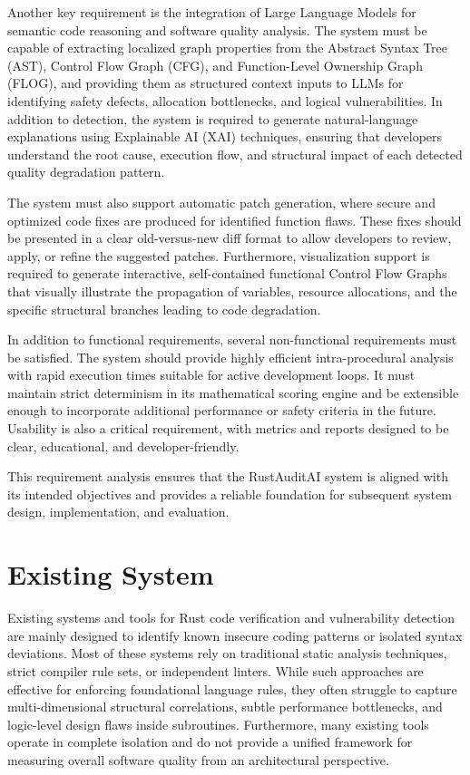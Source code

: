 Another key requirement is the integration of Large Language Models for semantic code reasoning and software quality analysis. The system must be capable of extracting localized graph properties from the Abstract Syntax Tree (AST), Control Flow Graph (CFG), and Function-Level Ownership Graph (FLOG), and providing them as structured context inputs to LLMs for identifying safety defects, allocation bottlenecks, and logical vulnerabilities. In addition to detection, the system is required to generate natural-language explanations using Explainable AI (XAI) techniques, ensuring that developers understand the root cause, execution flow, and structural impact of each detected quality degradation pattern.

The system must also support automatic patch generation, where secure and optimized code fixes are produced for identified function flaws. These fixes should be presented in a clear old-versus-new diff format to allow developers to review, apply, or refine the suggested patches. Furthermore, visualization support is required to generate interactive, self-contained functional Control Flow Graphs that visually illustrate the propagation of variables, resource allocations, and the specific structural branches leading to code degradation.

In addition to functional requirements, several non-functional requirements must be satisfied. The system should provide highly efficient intra-procedural analysis with rapid execution times suitable for active development loops. It must maintain strict determinism in its mathematical scoring engine and be extensible enough to incorporate additional performance or safety criteria in the future. Usability is also a critical requirement, with metrics and reports designed to be clear, educational, and developer-friendly.

This requirement analysis ensures that the RustAuditAI system is aligned with its intended objectives and provides a reliable foundation for subsequent system design, implementation, and evaluation.

\section{Existing System}
\hspace{0.5cm}
Existing systems and tools for Rust code verification and vulnerability detection are mainly designed to identify known insecure coding patterns or isolated syntax deviations. Most of these systems rely on traditional static analysis techniques, strict compiler rule sets, or independent linters. While such approaches are effective for enforcing foundational language rules, they often struggle to capture multi-dimensional structural correlations, subtle performance bottlenecks, and logic-level design flaws inside subroutines. Furthermore, many existing tools operate in complete isolation and do not provide a unified framework for measuring overall software quality from an architectural perspective.

